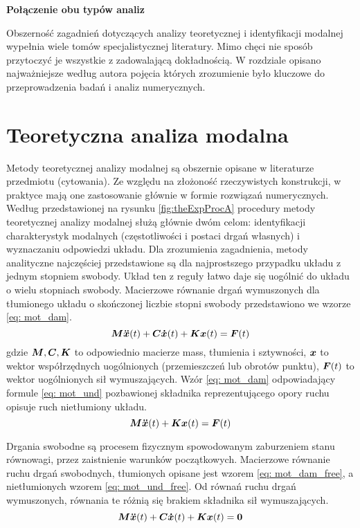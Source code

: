 \textbf{Połączenie obu typów analiz}

Obszerność zagadnień dotyczących analizy teoretycznej i identyfikacji modalnej wypełnia wiele tomów specjalistycznej literatury. Mimo chęci nie sposób przytoczyć je wszystkie z zadowalającą dokładnością. W rozdziale opisano najważniejsze według autora pojęcia których zrozumienie było kluczowe do  przeprowadzenia badań i analiz numerycznych.

\section{Teoretyczna analiza modalna}
\label{section: eigen}
Metody teoretycznej analizy modalnej są obszernie opisane w literaturze przedmiotu (cytowania). Ze względu na złożoność rzeczywistych konstrukcji, w praktyce mają one zastosowanie głównie w formie rozwiązań numerycznych.  Według przedstawionej na rysunku \ref{fig:theExpProcA} procedury metody teoretycznej analizy modalnej służą głównie dwóm celom: identyfikacji charakterystyk modalnych (częstotliwości i postaci drgań własnych) i wyznaczaniu odpowiedzi układu. Dla zrozumienia zagadnienia, metody analityczne najczęściej przedstawione są dla najprostszego przypadku układu z jednym stopniem swobody. Układ ten z reguły łatwo daje się uogólnić do układu o wielu stopniach swobody. Macierzowe równanie drgań wymuszonych dla tłumionego układu o skończonej liczbie stopni swobody przedstawiono we wzorze \ref{eq: mot_dam}. 
\begin{equation} \label{eq: mot_dam}
\bm{M} \bm{\ddot{x}}(t) +\bm{C} \bm{\dot{x}}(t)+ \bm{Kx}(t) = \bm{F}(t)
\end{equation}
gdzie $\bm{M},\bm{C},\bm{K}$ to odpowiednio macierze mass, tłumienia i sztywności, $\bm{x}$ to wektor współrzędnych uogólnionych (przemieszczeń lub obrotów punktu), $\bm{F}(t)$ to wektor uogólnionych sił wymuszających. Wzór \ref{eq: mot_dam} odpowiadający formule \ref{eq: mot_und} pozbawionej składnika reprezentującego opory ruchu opisuje ruch nietłumiony układu. 
\begin{equation} \label{eq: mot_und}
\bm{M} \bm{\ddot{x}}(t) +\bm{Kx}(t) = \bm{F}(t)
\end{equation}

Drgania swobodne są procesem fizycznym spowodowanym zaburzeniem stanu równowagi, przez zaistnienie warunków początkowych. Macierzowe równanie ruchu drgań swobodnych, tłumionych opisane jest wzorem \ref{eq: mot_dam_free}, a nietłumionych wzorem \ref{eq: mot_und_free}. Od równań ruchu drgań wymuszonych, równania te różnią się brakiem składnika sił wymuszających.
\begin{equation} \label{eq: mot_dam_free}
\bm{M} \bm{\ddot{x}}(t) +\bm{C} \bm{\dot{x}}(t)+ \bm{Kx}(t) = \bm{0}
\end{equation}

